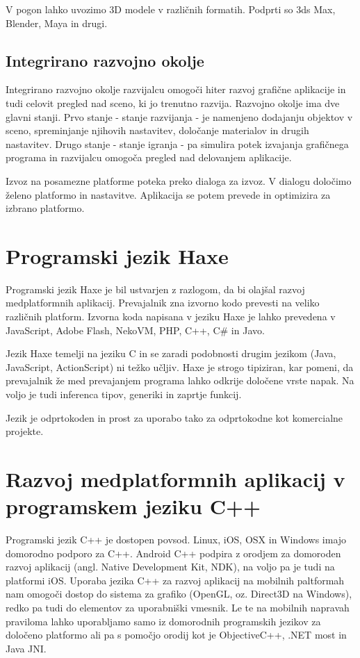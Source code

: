 V pogon lahko uvozimo 3D modele v različnih formatih. Podprti so 3ds Max, Blender, Maya in drugi. 

\subsection{Integrirano razvojno okolje} 

Integrirano razvojno okolje razvijalcu omogoči hiter razvoj grafične aplikacije in tudi celovit pregled nad sceno, ki jo trenutno razvija. Razvojno okolje ima dve glavni stanji. Prvo stanje - stanje razvijanja - je namenjeno dodajanju objektov v sceno, spreminjanje njihovih nastavitev, določanje materialov in drugih nastavitev. Drugo stanje - stanje igranja - pa simulira potek izvajanja grafičnega programa in razvijalcu omogoča pregled nad delovanjem aplikacije. 

Izvoz na posamezne platforme poteka preko dialoga za izvoz. V dialogu določimo želeno platformo in nastavitve. Aplikacija se potem prevede in optimizira za izbrano platformo.


\section{Programski jezik Haxe}
\label{sec:haxe}

Programski jezik Haxe \cite{haxe} je bil ustvarjen z razlogom, da bi olajšal razvoj medplatformnih aplikacij. Prevajalnik zna izvorno kodo prevesti na veliko različnih platform. Izvorna koda napisana v jeziku Haxe je lahko prevedena v JavaScript, Adobe Flash, NekoVM, PHP, C++, C\# in Javo.

Jezik Haxe temelji na jeziku C in se zaradi podobnosti drugim jezikom (Java, JavaScript, ActionScript) ni težko učljiv. Haxe je strogo tipiziran, kar pomeni, da prevajalnik že med prevajanjem programa lahko odkrije določene vrste napak. Na voljo je tudi inferenca tipov, generiki in zaprtje funkcij. 

Jezik je odprtokoden in prost za uporabo tako za odprtokodne kot komercialne projekte.

\section{Razvoj medplatformnih aplikacij v programskem jeziku C++}
\label{sec:cpp}
Programski jezik C++ je dostopen povsod. Linux, iOS, OSX in Windows imajo domorodno podporo za C++. Android C++ podpira z orodjem za domoroden razvoj aplikacij (angl. Native Development Kit, NDK), na voljo pa je tudi na platformi iOS. Uporaba jezika C++ za razvoj aplikacij na mobilnih paltformah nam omogoči dostop do sistema za grafiko (OpenGL, oz. Direct3D na Windows), redko pa tudi do elementov za uporabniški vmesnik. Le te na mobilnih napravah praviloma lahko uporabljamo samo iz domorodnih programskih jezikov za določeno platformo ali pa s pomočjo orodij kot je ObjectiveC++, .NET most in Java JNI.

